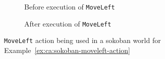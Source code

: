 \documentclass[../Master.tex]{subfiles}
\providecommand{\master}{..}
\begin{document}
\begin{figure}
    \hspace*{0.1\textwidth}%
    \begin{subfigure}{0.35\textwidth}
        \centering
        \resizebox{\linewidth}{!}{}
        \caption{Before execution of \texttt{MoveLeft}}
    \end{subfigure}%
    \hspace*{0.1\textwidth}%
    \begin{subfigure}{0.35\textwidth}
        \centering
        \resizebox{\linewidth}{!}{}
        \caption{After execution of \texttt{MoveLeft}}
    \end{subfigure}
    \hspace*{0.1\textwidth}
	\caption{\label{fig:ca:sokoban-moveleft-action}\texttt{MoveLeft} action being used in a sokoban world for Example~\ref{ex:ca:sokoban-moveleft-action} }

\end{figure}
\end{document}
